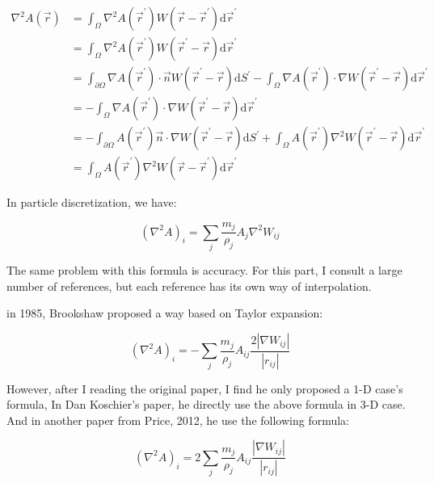 \documentclass[10pt, oneside]{article}
\begin{document}
\begin{equation}
    \begin{aligned}
        \nabla^2 A(\vec{r}) &= \int_{\Omega} \nabla^2 A(\vec{r}^\prime) W(\vec{r} - \vec{r}^\prime) \mathrm{d}\vec{r}^\prime \\
        &= \int_{\Omega} \nabla^2 A(\vec{r}^\prime) W(\vec{r}^\prime - \vec{r}) \mathrm{d}\vec{r}^\prime \\
        &= \int_{\partial \Omega} \nabla A(\vec{r}^\prime) \cdot \vec{n} W(\vec{r}^\prime - \vec{r}) \mathrm{d}S^\prime -
        \int_{\Omega} \nabla A(\vec{r}^\prime) \cdot \nabla W(\vec{r}^\prime - \vec{r}) \mathrm{d}\vec{r}^\prime\\
        &= -\int_{\Omega} \nabla A(\vec{r}^\prime) \cdot \nabla W(\vec{r}^\prime - \vec{r}) \mathrm{d}\vec{r}^\prime\\
        &= -\int_{\partial \Omega} A(\vec{r}^\prime)\vec{n} \cdot \nabla W(\vec{r}^\prime - \vec{r}) \mathrm{d}S^\prime +
        \int_{\Omega} A(\vec{r}^\prime) \nabla^2 W(\vec{r}^\prime - \vec{r}) \mathrm{d}\vec{r}^\prime\\
        &= \int_{\Omega} A(\vec{r}^\prime) \nabla^2 W(\vec{r} - \vec{r}^\prime) \mathrm{d}\vec{r}^\prime
    \end{aligned}
\end{equation}

In particle discretization, we have:

\begin{equation}
    (\nabla^2 A)_i = \sum_{j} \frac{m_j}{\rho_j} A_j \nabla^2 W_{ij}
\end{equation}

The same problem with this formula is accuracy. 
For this part, 
I consult a large number of references, 
but each reference has its own way of interpolation.

in 1985, Brookshaw proposed a way based on Taylor expansion:

\begin{equation}
    (\nabla^2 A)_i = -\sum_{j} \frac{m_j}{\rho_j} A_{ij}\frac{2|\nabla W_{ij}|}{|r_{ij}|}
\end{equation}

However, after I reading the original paper, I find he only proposed a 1-D case's formula, 
In Dan Koschier's paper, he directly use the above formula in 3-D case. 
And in another paper from Price, 2012, he use the following formula:

\begin{equation}
    (\nabla^2 A)_i = 2\sum_{j} \frac{m_j}{\rho_j} A_{ij}\frac{|\nabla W_{ij}|}{|r_{ij}|}
\end{equation}
\end{document}
